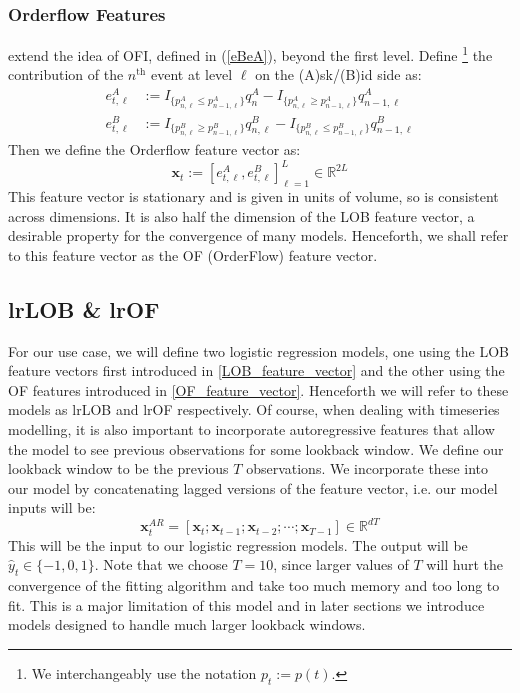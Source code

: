 \subsubsection{Orderflow Features}
\cite{KOLM2023} extend the idea of OFI, defined in (\ref{eBeA}), beyond the first level.
Define \footnote{We interchangeably use the notation $p_t := p(t)$.} the contribution of
the $n^\text{th}$ event at level $\ell$ on the (A)sk/(B)id side as: 
\begin{align}
    e_{t,\ell}^{A} &:=  I_{\{ p_{n, \ell}^A \leq p_{n-1,\ell}^A \}} q_{n}^A - I_{\{ p_{n, \ell}^A \geq p_{n-1, \ell}^A \}} q_{n-1, \ell}^A \\
    e_{t, \ell}^{B} &:= I_{\{ p_{n, \ell}^B \geq p_{n-1, \ell}^B \}} q_{n, \ell}^B - I_{\{ p_{n, \ell}^B \leq p_{n-1, \ell}^B \}} q_{n-1, \ell}^B
\end{align}
Then we define the Orderflow feature vector as:
\begin{equation}
    \bm{x}_t := [e_{t, \ell}^{A}, e_{t, \ell}^{B}]_{\ell=1}^L \in \mathbb{R}^{2L} \label{OF_feature_vector}
\end{equation}
This feature vector is stationary and is given in units of volume, so is consistent across dimensions.
It is also half the dimension of the LOB feature vector, a desirable property for the convergence of many models.
Henceforth, we shall refer to this feature vector as the OF (OrderFlow) feature vector.


\subsection{lrLOB \& lrOF}
For our use case, we will define two logistic regression models, one using the LOB feature vectors first introduced in \ref{LOB_feature_vector}
and the other using the OF features introduced in \ref{OF_feature_vector}. 
Henceforth we will refer to these models as lrLOB and lrOF respectively.
Of course, when dealing with timeseries modelling, it is also important to incorporate autoregressive
features that allow the model to see previous observations for some lookback window.
We define our lookback window to be the previous $T$ observations. We incorporate these into
our model by concatenating lagged versions of the feature vector, i.e. our model inputs will be:
\begin{equation}
    \bm{x}^{AR}_t = [\bm{x}_t; \bm{x}_{t-1}; \bm{x}_{t-2}; \cdots; \bm{x}_{T-1}] \in  \mathbb{R}^{dT}\label{AR_features}
\end{equation}
This will be the input to our logistic regression models.
The output will be $\hat{y}_t \in \{-1, 0, 1\}$.
Note that we choose $T=10$, since larger values of $T$ will hurt the convergence
of the fitting algorithm and take too much memory and too long to fit.
This is a major limitation of this model and in later sections we introduce models
designed to handle much larger lookback windows.
\clearpage

